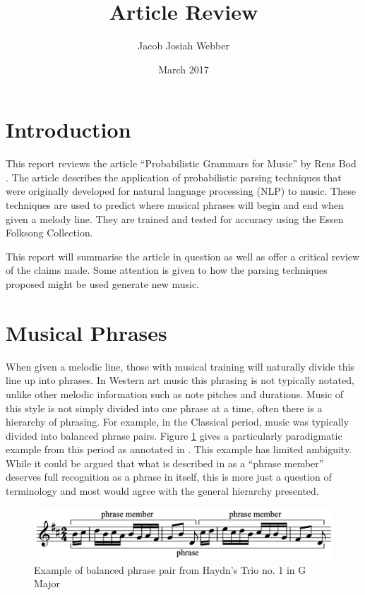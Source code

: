 \documentclass[a4paper,12pt]{article}
\title{Article Review}
\author{Jacob Josiah Webber}
\date{March 2017}
\begin{document}
\maketitle

\section{Introduction}
This report reviews the article ``Probabilistic Grammars for Music'' by Rens Bod \cite{Bod_probabilisticgrammars}. The article describes the application of probabilistic parsing techniques that were originally developed for natural language processing (NLP) to music. These techniques are used to predict where musical phrases will begin and end when given a melody line. They are trained and tested for accuracy using the Essen Folksong Collection.

This report will summarise the article in question as well as offer a critical review of the claims made. Some attention is given to how the parsing techniques proposed might be used generate new music.



\section{Musical Phrases}
\label{phrases}
When given a melodic line, those with musical training will naturally divide this line up into phrases. In Western art music this phrasing is not typically notated, unlike other melodic information such as note pitches and durations. Music of this style is not simply divided into one phrase at a time, often there is a hierarchy of phrasing. For example, in the Classical period, music was typically divided into balanced phrase pairs. Figure \ref{haydn} gives a particularly paradigmatic example from this period as annotated in \cite{music-theory}. This example has limited ambiguity. While it could be argued that what is described in \cite{music-theory} as a ``phrase member'' deserves full recognition as a phrase in itself, this is more just a question of terminology and most would agree with the general hierarchy presented.

\begin{figure}
\centering
\includegraphics[width=\textwidth]{diagrams/Haydn}
\caption{Example of balanced phrase pair from  Haydn's Trio no. 1 in G Major}
\label{haydn}
\end{figure}
\end{document}
